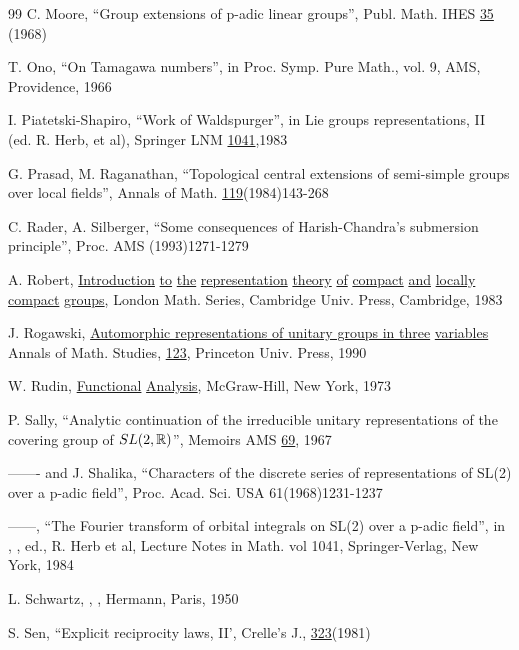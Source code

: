 \begin{thebibliography}{99}
 C. Moore, ``Group extensions of p-adic linear groups'', 
Publ. Math. IHES
\underline{35} (1968)

 T. Ono, ``On Tamagawa numbers'', in Proc. Symp. Pure Math., 
vol. 9, AMS,
Providence, 1966

 I. Piatetski-Shapiro, ``Work of Waldspurger'', in Lie groups 
representations, II (ed. R. Herb, et al), Springer LNM 
\underline{1041},1983

 G. Prasad, M. Raganathan,
``Topological central extensions of
semi-simple groups over local fields'', Annals of Math.
\underline{119}(1984)143-268

 C. Rader, A. Silberger, ``Some consequences of
Harish-Chandra's submersion principle'', Proc. AMS 
(1993)1271-1279

 A. Robert, \underline{Introduction} \underline{to} 
\underline{the} 
\underline{representation} \underline{theory} \underline{of}
\underline{compact} \underline{and} \underline{locally}
\underline{compact} \underline{groups},
London Math. Series, Cambridge Univ. Press, Cambridge, 1983

 J. Rogawski,
\underline{Automorphic representations of unitary groups
in three} \underline{variables}
Annals of Math. Studies, \underline{123}, Princeton Univ. Press, 1990

 W. Rudin, \underline{Functional} \underline{Analysis}, 
McGraw-Hill, New
York, 1973

 P. Sally, ``Analytic continuation of the irreducible unitary
representations of the covering group of $SL(2,{\Bbb{R}})$'', Memoirs AMS 
\underline{69}, 1967

 ------- and J. Shalika,
``Characters of the discrete series of
representations of SL(2) over a p-adic field'', Proc. Acad. Sci. USA
61(1968)1231-1237

 ------, ``The Fourier transform of orbital integrals
on SL(2) over a p-adic field'', in  
, ,
ed., R. Herb et al, Lecture Notes in Math. vol 1041,
Springer-Verlag, New York, 1984

 L. Schwartz,   
, , Hermann, Paris, 1950

 S. Sen, ``Explicit reciprocity laws, II', Crelle's J., 
\underline{323}(1981)


\end{thebibliography}
